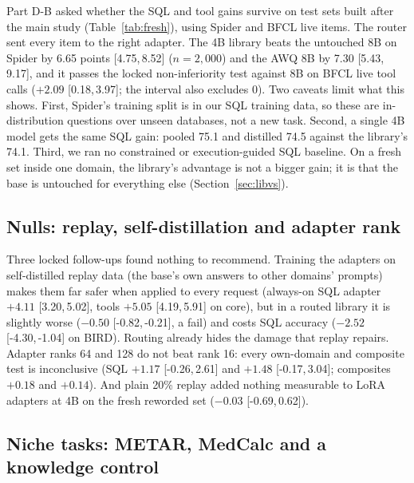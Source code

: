 \documentclass[11pt]{article}
\newcommand{\ci}[2]{[#1,\allowbreak\,#2]}
\begin{document}
Part D-B asked whether the SQL and tool gains survive on test sets built after the main study (Table~\ref{tab:fresh}),
using Spider \citep{yu2018spider} and BFCL live items.
The router sent every item to the right adapter. The 4B library beats the untouched 8B on Spider by 6.65 points
\ci{4.75}{8.52} ($n=2{,}000$) and the AWQ 8B by 7.30 \ci{5.43}{9.17}, and it passes the locked non-inferiority test
against 8B on BFCL live tool calls ($+2.09$ \ci{0.18}{3.97}; the interval also excludes 0). Two caveats limit what this shows. First, Spider's training split is in our SQL
training data, so these are in-distribution questions over unseen databases, not a new task. Second, a single 4B
model gets the same SQL gain: pooled 75.1 and distilled 74.5 against the library's 74.1. Third, we ran no
constrained or execution-guided SQL baseline. On a fresh set inside one
domain, the library's advantage is not a bigger gain; it is that the base is untouched for everything else
(Section~\ref{sec:libvs}).

\subsection{Nulls: replay, self-distillation and adapter rank}
\label{sec:nulls}
Three locked follow-ups found nothing to recommend. Training the adapters on self-distilled replay data (the base's
own answers to other domains' prompts) makes them far safer when applied to every request (always-on SQL adapter
$+4.11$ \ci{3.20}{5.02}, tools $+5.05$ \ci{4.19}{5.91} on core), but in a routed library it is slightly worse
($-0.50$ \ci{-0.82}{-0.21}, a fail) and costs SQL accuracy ($-2.52$ \ci{-4.30}{-1.04} on BIRD). Routing already hides
the damage that replay repairs. Adapter ranks 64 and 128 do not beat rank 16: every own-domain and composite test is
inconclusive (SQL $+1.17$ \ci{-0.26}{2.61} and $+1.48$ \ci{-0.17}{3.04}; composites $+0.18$ and $+0.14$). And plain
20\% replay added nothing measurable to LoRA adapters at 4B on the fresh reworded set ($-0.03$ \ci{-0.69}{0.62}).

\subsection{Niche tasks: METAR, MedCalc and a knowledge control}
\label{sec:niche}
\end{document}
